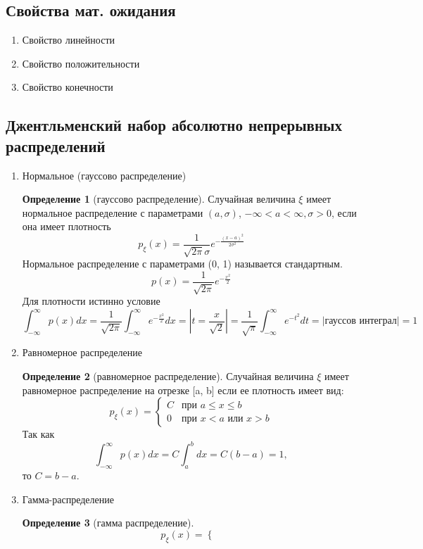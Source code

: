 \documentclass[a4paper]{article}
\theoremstyle{definition}
\newtheorem*{definition}{Определение}
\theoremstyle{remark}
\begin{document}
\subsection{Свойства мат. ожидания}
\begin{enumerate}
    \item Свойство линейности
    \item Свойство положительности
    \item Свойство конечности
\end{enumerate}
\subsection{Джентльменский набор абсолютно непрерывных распределений}
\begin{enumerate}
    \item Нормальное (гауссово распределение)
    \begin{definition}[гауссово распределение]
        Случайная величина $\xi$ имеет нормальное распределение с параметрами $(a, \sigma)$, $-\infty < a < \infty, \sigma > 0$, если она имеет плотность
        \[p_\xi(x) = \frac1{\sqrt{2\pi}\sigma} e^{-\frac{(x-a)^2}{2\sigma^2}}\]
        Нормальное распределение с параметрами (0, 1) называется стандартным.
        \[p(x) = \frac1{\sqrt{2\pi}}e^{-\frac{x^2}2}\]
        Для плотности истинно условие
        \[\int_{-\infty}^{\infty}p(x) dx = \frac1{\sqrt{2\pi}} \int_{-\infty}^{\infty} e^{-\frac{x^2}2}dx = |t = \frac{x}{\sqrt{2}}|= \frac1{\sqrt{\pi}} \int_{-\infty}^{\infty}  e^{-t^2}dt = |\text{гауссов интеграл}| = 1\]
    \end{definition}
    \item Равномерное распределение
    \begin{definition}[равномерное распределение]
        Случайная величина $\xi$ имеет равномерное распределение на отрезке [a, b] если ее плотность имеет вид:
        \[p_\xi (x) = \begin{cases}
            C & \text{при } a \le x \le b \\
            0 &\text{при } x < a \text{ или } x > b
        \end{cases}\]
        Так как 
        \[\int_{-\infty}^{\infty}p(x) dx = C \int_{a}^{b}dx = C(b-a) = 1,\]
        то $C = b - a.$
    \end{definition}
    \item Гамма-распределение 
    \begin{definition}[гамма распределение]
        \[p_\xi (x) = \begin{cases}

\end{cases}\]
\end{definition}
\end{enumerate}
\end{document}

